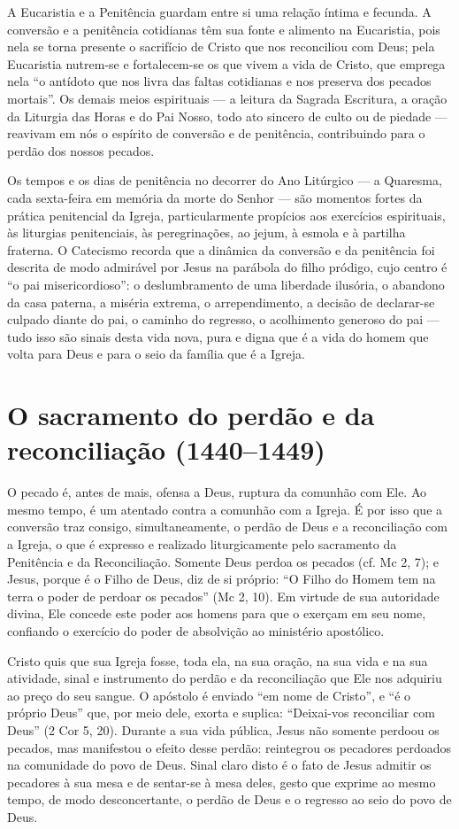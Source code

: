 A Eucaristia e a Penitência guardam entre si uma relação íntima e fecunda. A conversão e a penitência cotidianas têm sua fonte e alimento na Eucaristia, pois nela se torna presente o sacrifício de Cristo que nos reconciliou com Deus; pela Eucaristia nutrem-se e fortalecem-se os que vivem a vida de Cristo, que emprega nela ``o antídoto que nos livra das faltas cotidianas e nos preserva dos pecados mortais''. Os demais meios espirituais --- a leitura da Sagrada Escritura, a oração da Liturgia das Horas e do Pai Nosso, todo ato sincero de culto ou de piedade --- reavivam em nós o espírito de conversão e de penitência, contribuindo para o perdão dos nossos pecados.

Os tempos e os dias de penitência no decorrer do Ano Litúrgico --- a Quaresma, cada sexta-feira em memória da morte do Senhor --- são momentos fortes da prática penitencial da Igreja, particularmente propícios aos exercícios espirituais, às liturgias penitenciais, às peregrinações, ao jejum, à esmola e à partilha fraterna. O Catecismo recorda que a dinâmica da conversão e da penitência foi descrita de modo admirável por Jesus na parábola do filho pródigo, cujo centro é ``o pai misericordioso'': o deslumbramento de uma liberdade ilusória, o abandono da casa paterna, a miséria extrema, o arrependimento, a decisão de declarar-se culpado diante do pai, o caminho do regresso, o acolhimento generoso do pai --- tudo isso são sinais desta vida nova, pura e digna que é a vida do homem que volta para Deus e para o seio da família que é a Igreja.

\section{O sacramento do perdão e da reconciliação (1440--1449)}

O pecado é, antes de mais, ofensa a Deus, ruptura da comunhão com Ele. Ao mesmo tempo, é um atentado contra a comunhão com a Igreja. É por isso que a conversão traz consigo, simultaneamente, o perdão de Deus e a reconciliação com a Igreja, o que é expresso e realizado liturgicamente pelo sacramento da Penitência e da Reconciliação. Somente Deus perdoa os pecados (cf. Mc 2, 7); e Jesus, porque é o Filho de Deus, diz de si próprio: ``O Filho do Homem tem na terra o poder de perdoar os pecados'' (Mc 2, 10). Em virtude de sua autoridade divina, Ele concede este poder aos homens para que o exerçam em seu nome, confiando o exercício do poder de absolvição ao ministério apostólico.

Cristo quis que sua Igreja fosse, toda ela, na sua oração, na sua vida e na sua atividade, sinal e instrumento do perdão e da reconciliação que Ele nos adquiriu ao preço do seu sangue. O apóstolo é enviado ``em nome de Cristo'', e ``é o próprio Deus'' que, por meio dele, exorta e suplica: ``Deixai-vos reconciliar com Deus'' (2 Cor 5, 20). Durante a sua vida pública, Jesus não somente perdoou os pecados, mas manifestou o efeito desse perdão: reintegrou os pecadores perdoados na comunidade do povo de Deus. Sinal claro disto é o fato de Jesus admitir os pecadores à sua mesa e de sentar-se à mesa deles, gesto que exprime ao mesmo tempo, de modo desconcertante, o perdão de Deus e o regresso ao seio do povo de Deus.

